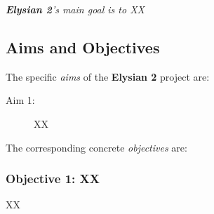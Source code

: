 \documentclass[a4paper,11pt]{article}
\newcommand{\project}[1]{\textbf{#1}\xspace}
\newcommand{\SECURITY}{\project{Elysian 2}}
\newcommand{\TheProject}{\SECURITY}
\begin{document}





\begin{mdframed}[backgroundcolor=blue!5]
\emph{\TheProject's main goal is to XX}
\end{mdframed}





\subsection{Aims and Objectives}
\label{sect:objectives}


The specific \emph{aims} of the \TheProject{} project are:

\begin{description}
\item[Aim 1:] XX


\end{description}

The corresponding concrete \emph{objectives} are: 


\subsubsection*{Objective 1: XX}
\vspace{-6pt}
XX

\newpage

\label{bibliography}

%
%
%
\end{document}
